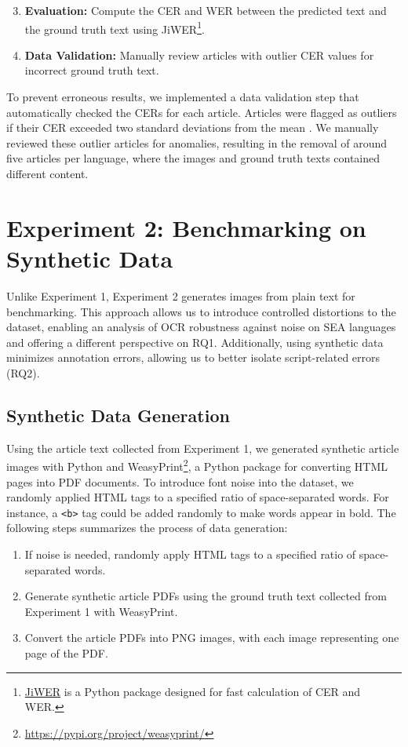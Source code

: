 \documentclass[12pt,oneside]{memoir}
\begin{document}
\begin{enumerate}
    \setcounter{enumi}{2}
    \item \textbf{Evaluation:} Compute the CER and WER between the predicted text and the ground truth text using JiWER\footnote{\href{https://pypi.org/project/jiwer/}{JiWER} is a Python package designed for fast calculation of CER and WER.}.
    \item \textbf{Data Validation:} Manually review articles with outlier CER values for incorrect ground truth text.
\end{enumerate}

To prevent erroneous results, we implemented a data validation step that automatically checked the CERs for each article.
Articles were flagged as outliers if their CER exceeded two standard deviations from the mean \parencite{cousineau-and-chartier-2010}. 
We manually reviewed these outlier articles for anomalies, resulting in the removal of around five articles per language, where the images and ground truth texts contained different content.

\section{Experiment 2: Benchmarking on Synthetic Data}

Unlike Experiment 1, Experiment 2 generates images from plain text for benchmarking. 
This approach allows us to introduce controlled distortions to the dataset, enabling an analysis of OCR robustness against noise on SEA languages and offering a different perspective on RQ1.
Additionally, using synthetic data minimizes annotation errors, allowing us to better isolate script-related errors (RQ2).

\subsection{Synthetic Data Generation}

Using the article text collected from Experiment 1, we generated synthetic article images with Python and WeasyPrint\footnote{\url{https://pypi.org/project/weasyprint/}}, a Python package for converting HTML pages into PDF documents.
To introduce font noise into the dataset, we randomly applied HTML tags to a specified ratio of space-separated words.
For instance, a \texttt{<b>} tag could be added randomly to make words appear in bold.
The following steps summarizes the process of data generation:

\begin{enumerate}
    \item If noise is needed, randomly apply HTML tags to a specified ratio of space-separated words.
    \item Generate synthetic article PDFs using the ground truth text collected from Experiment 1 with WeasyPrint.
    \item Convert the article PDFs into PNG images, with each image representing one page of the PDF.
\end{enumerate}
\end{document}
